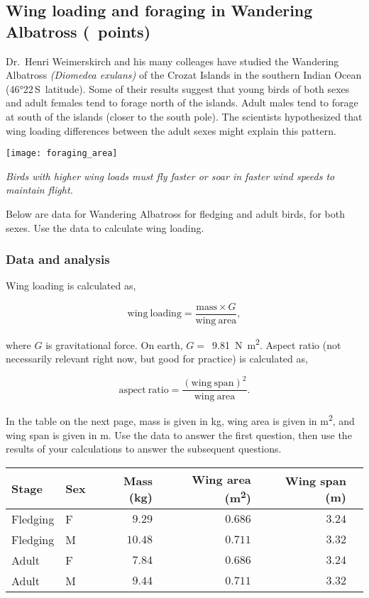 \documentclass[12pt, addpoints, hidelinks]{exam}
\begin{document}

\subsection*{Wing loading and foraging in Wandering Albatross (\numpoints\ points)}


Dr.~Henri Weimerskirch and his many colleages have studied the Wandering Albatross \textit{(Diomedea exulans)} of the Crozat Islands in the southern Indian Ocean (46°22\textprime{}\,S~latitude). Some of their results suggest that young birds of both sexes and adult females tend to forage north of the islands. Adult males tend to forage at south of the islands (closer to the south pole). The scientists hypothesized that wing loading differences between the adult sexes might explain this pattern. 

\texttt{[image: foraging\_area]}

\textit{Birds with higher wing loads must fly faster or soar in faster wind speeds to maintain flight.}

Below are data for Wandering Albatross for fledging and adult birds, for both sexes. Use the data to calculate wing loading.


\subsubsection*{Data and analysis}

Wing loading is calculated as,

\vspace{-\baselineskip}

\[ \mathrm{wing~loading} = \frac{\mathrm{mass} \times G}{\mathrm{wing~area}},\]

where $G$ is gravitational force. On earth, $G =$~\qty[mode=math]{9.81}{\newton\meter^2}. Aspect ratio (not necessarily relevant right now, but good for practice) is calculated as,

\[ \mathrm{aspect~ratio} = \frac{\mathrm{(wing~span)}^2}{\mathrm{wing~area}}.\]


In the table on the next page, mass is given in \unit{kg}, wing area is given in \unit{\meter^2}, and wing span is given in \unit{\meter}. Use the data to answer the first question, then use the results of your calculations to answer the subsequent questions.


\begin{tabular}{@{}llrrrr@{}}
\toprule
Stage & Sex & Mass (kg) & Wing area (\unit{\meter^2}) & Wing span (\unit{\meter}) \\
\midrule
Fledging	&	F	&	$9.29$ & $0.686$	&	$3.24$ & 	\\
Fledging		&	M 	&	$10.48$ &	$0.711$ &	$3.32$ & 	\\
Adult	&	F	&	$7.84$ & $0.686$	& $3.24$	& 	\\
Adult		&	M 	& $9.44$	& $0.711$	& $3.32$	& 	\\
\bottomrule
\end{tabular}
\end{document}
